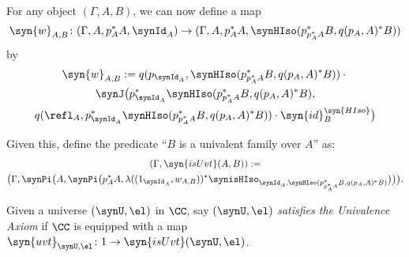 \begin{definition}
For any object $(\Gamma,A,B)$, we can now define a map
\[ \syn{w}_{A,B} \colon (\Gamma,A,p_A^*A,\synId_A) \to (\Gamma,A,p_A^*A,\synHIso(p_{p_A^*A}^*B,q(p_A,A)^*B)) \]
by
\begin{multline*}
  \syn{w}_{A,B} := q(p_{\synId_A}, \synHIso(p_{p_A^*A}^*B,q(p_A,A)^*B)) \cdot {}\\
  \synJ\big( p_{\synId_A}^*\synHIso(p_{p_A^*A}^*B,q(p_A,A)^*B), \\
    q(\refl_A,p_{\synId_A}^*\synHIso(p_{p_A^*A}^*B,q(p_A,A)^*B)) \cdot \syn{id}^{\syn{HIso}}_B \big)
\end{multline*}

Given this, define the predicate ``$B$ is a univalent family over $A$'' as:
\begin{multline*}
 (\Gamma,\syn{isUvt}(A,B)) := \\
  \big(\Gamma,\synPi\big(A,\synPi\big(p_A^*A,\lambda((1_{\synId_A},w_{A,B}))^*\synisHIso_{\synId_A,\synHIso(p_{p_A^*A}^*B,q(p_A,A)^*B)}\big)\big)\big).
\end{multline*}
\end{definition}

\begin{definition}
Given a universe $(\synU,\el)$ in $\CC$, say $(\synU,\el)$ \emph{satisfies the Univalence Axiom} if $\CC$ is equipped with a map $\syn{uvt}_{\synU,\el} \colon 1 \to \syn{isUvt}(\synU,\el)$.
\end{definition}

